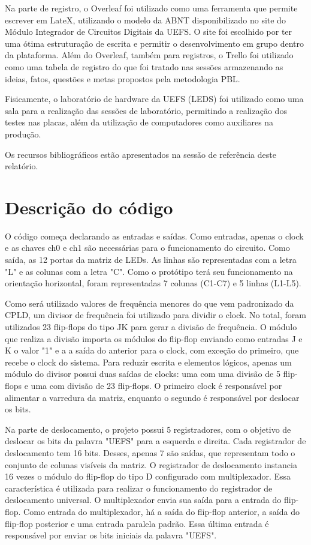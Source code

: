 Na parte de registro, o Overleaf foi utilizado como uma ferramenta que permite escrever em LateX, utilizando o modelo da ABNT disponibilizado no site do Módulo Integrador de Circuitos Digitais da UEFS. O site foi escolhido por ter uma ótima estruturação de escrita e permitir o desenvolvimento em grupo dentro da plataforma. Além do Overleaf, também para registros, o Trello foi utilizado como uma tabela de registro do que foi tratado nas sessões armazenando as ideias, fatos, questões e metas propostos pela metodologia PBL.

Fisicamente, o laboratório de hardware da UEFS (LEDS) foi utilizado como uma sala para a realização das sessões de laboratório, permitindo a realização dos testes nas placas, além da utilização de computadores como auxiliares na produção.

Os recursos bibliográficos estão apresentados na sessão de referência deste relatório.

\section{Descrição do código}
O código começa declarando as entradas e saídas. Como entradas, apenas o clock e as chaves ch0 e ch1 são necessárias para o funcionamento do circuito. Como saída, as 12 portas da matriz de LEDs. As linhas são representadas com a letra "L" e as colunas com a letra "C". Como o protótipo terá seu funcionamento na orientação horizontal, foram representadas 7 colunas (C1-C7) e 5 linhas (L1-L5). 

Como será utilizado valores de frequência menores do que vem padronizado da CPLD, um divisor de frequência foi utilizado para dividir o clock. No total, foram utilizados 23 flip-flops do tipo JK para gerar a divisão de frequência. O módulo que realiza a divisão importa os módulos do flip-flop enviando como entradas J e K o valor "1" e a a saída do anterior para o clock, com exceção do primeiro, que recebe o clock do sistema. Para reduzir escrita e elementos lógicos, apenas um módulo do divisor possui duas saídas de clocks: uma com uma divisão de 5 flip-flops e uma com divisão de 23 flip-flops. O primeiro clock é responsável por alimentar a varredura da matriz, enquanto o segundo é responsável por deslocar os bits.

Na parte de deslocamento, o projeto possui 5 registradores, com o objetivo de deslocar os bits da palavra "UEFS" para a esquerda e direita. Cada registrador de deslocamento tem 16 bits. Desses, apenas 7 são saídas, que representam todo o conjunto de colunas visíveis da matriz. O registrador de deslocamento instancia 16 vezes o módulo do flip-flop do tipo D configurado com multiplexador. Essa característica é utilizada para realizar o funcionamento do registrador de deslocamento universal. O multiplexador envia sua saída para a entrada do flip-flop. Como entrada do multiplexador, há a saída do flip-flop anterior, a saída do flip-flop posterior e uma entrada paralela padrão. Essa última entrada é responsável por enviar os bits iniciais da palavra "UEFS".


